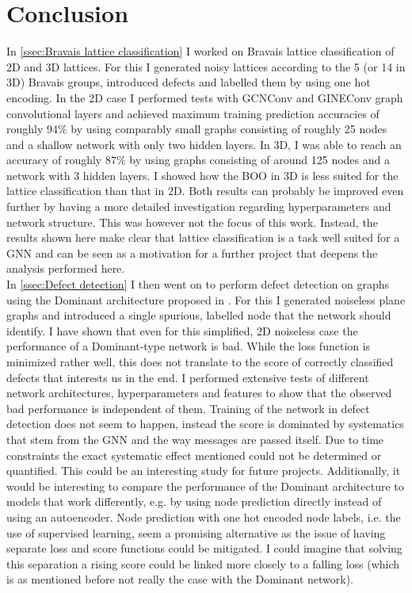 \documentclass[11pt,a4paper]{article}
\begin{document}
\section{Conclusion}
\label{sec:Conclusion}
In \autoref{ssec:Bravais lattice classification} I worked on Bravais lattice classification of 2D and 3D lattices. 
For this I generated noisy lattices according to the 5 (or 14 in 3D) Bravais groups, introduced defects and labelled them by using one hot encoding. 
In the 2D case I performed tests with GCNConv and GINEConv graph convolutional layers and achieved maximum training prediction accuracies of roughly $94\%$ by using comparably small graphs consisting of roughly 25 nodes and a shallow network with only two hidden layers. 
In 3D, I was able to reach an accuracy of roughly $87\%$ by using graphs consisting of around 125 nodes and a network with 3 hidden layers. 
I showed how the BOO in 3D is less suited for the lattice classification than that in 2D. 
Both results can probably be improved even further by having a more detailed investigation regarding hyperparameters and network structure. 
This was however not the focus of this work.
Instead, the results shown here make clear that lattice classification is a task well suited for a GNN and can be seen as a motivation for a further project that deepens the analysis performed here. \\

In \autoref{ssec:Defect detection} I then went on to perform defect detection on graphs using the Dominant architecture proposed in \cite{dingDeepAnomalyDetection2019}. 
For this I generated noiseless plane graphs and introduced a single spurious, labelled node that the network should identify. 
I have shown that even for this simplified, 2D noiseless case the performance of a Dominant-type network is bad. 
While the loss function is minimized rather well, this does not translate to the score of correctly classified defects that interests us in the end. 
I performed extensive tests of different network architectures, hyperparameters and features to show that the observed bad performance is independent of them. 
Training of the network in defect detection does not seem to happen, instead the score is dominated by systematics that stem from the GNN and the way messages are passed itself. 
Due to time constraints the exact systematic effect mentioned could not be determined or quantified. 
This could be an interesting study for future projects. 
Additionally, it would be interesting to compare the performance of the Dominant architecture to models that work differently, e.g. by using node prediction directly instead of using an autoencoder. 
Node prediction with one hot encoded node labels, i.e. the use of supervised learning, seem a promising alternative as the issue of having separate loss and score functions could be mitigated. 
I could imagine that solving this separation a rising score could be linked more closely to a falling loss (which is as mentioned before not really the case with the Dominant network). \\
\end{document}
